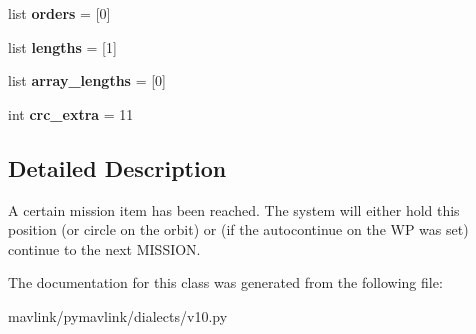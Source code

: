 \begin{DoxyCompactItemize}
\item 
\mbox{\label{classpymavlink_1_1dialects_1_1v10_1_1MAVLink__mission__item__reached__message_a2bcca3a7e6af9d66af57a8d5f7f52a4a}} 
list {\bfseries orders} = \mbox{[}0\mbox{]}
\item 
\mbox{\label{classpymavlink_1_1dialects_1_1v10_1_1MAVLink__mission__item__reached__message_a096cb876204bb4d0e5ba03317d8e7139}} 
list {\bfseries lengths} = \mbox{[}1\mbox{]}
\item 
\mbox{\label{classpymavlink_1_1dialects_1_1v10_1_1MAVLink__mission__item__reached__message_a1cc278aad3132cfa5b81e6cd9fdfc52a}} 
list {\bfseries array\+\_\+lengths} = \mbox{[}0\mbox{]}
\item 
\mbox{\label{classpymavlink_1_1dialects_1_1v10_1_1MAVLink__mission__item__reached__message_ad7b6a5f7273a42545434c83f002eabc0}} 
int {\bfseries crc\+\_\+extra} = 11
\end{DoxyCompactItemize}


\subsection{Detailed Description}
\begin{DoxyVerb}A certain mission item has been reached. The system will
either hold this position (or circle on the orbit) or (if the
autocontinue on the WP was set) continue to the next MISSION.
\end{DoxyVerb}
 

The documentation for this class was generated from the following file\+:\begin{DoxyCompactItemize}
\item 
mavlink/pymavlink/dialects/v10.\+py\end{DoxyCompactItemize}
